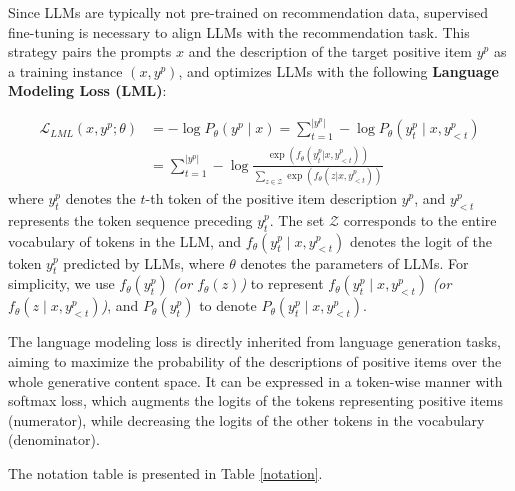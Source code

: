 \documentclass[sigconf,natbib=true]{acmart}
\begin{document}
Since LLMs are typically not pre-trained on recommendation data, supervised fine-tuning is necessary to align LLMs with the recommendation task. This strategy pairs the prompts $x$ and the description of the target positive item $y^p$ as a training instance $(x, y^p)$, and optimizes LLMs with the following \textbf{Language Modeling Loss (LML)}:

\begin{equation}
\begin{aligned}
 \mathcal{L}_{LML}(x, y^p; \theta) &= - \log P_{\theta} \left(y^p \mid x\right)
= \sum_{t=1}^{|y^p|} - \log P_{\theta} \left(y^p_t \mid x, y^p_{<t}\right) \\
&= \sum_{t=1}^{|y^p|} - \log \frac{\exp(f_\theta(y_t^p|x,y^p_{<t}))}{\sum_{z \in \mathcal{Z}} \exp(f_\theta(z|x,y^p_{<t}))}
\end{aligned}
\end{equation}
where $y^p_t$ denotes the $t$-th token of the positive item description $y^p$, and $y^p_{<t}$ represents the token sequence preceding $y^p_t$. The set $\mathcal{Z}$ corresponds to the entire vocabulary of tokens in the LLM, and $f_\theta(y^p_t \mid x, y^p_{<t})$ denotes the logit of the token $y^p_t$ predicted by LLMs, where $\theta$ denotes the parameters of LLMs. For simplicity, we use \(f_\theta(y^p_t)\) \textit{(or \(f_\theta(z)\))} to represent \(f_\theta(y^p_t \mid x, y^p_{<t})\) \textit{(or \(f_\theta(z \mid x, y^p_{<t})\))}, 
and \(P_{\theta}(y^p_t)\) to denote \(P_{\theta}(y^p_t \mid x, y^p_{<t})\).

The language modeling loss is directly inherited from language generation tasks, aiming to maximize the probability of the descriptions of positive items over the whole generative content space. It can be expressed in a token-wise manner with softmax loss, which augments the logits of the tokens representing positive items (numerator), while decreasing the logits of the other tokens in the vocabulary (denominator).

The notation table is presented in Table \ref{notation}.
\end{document}
